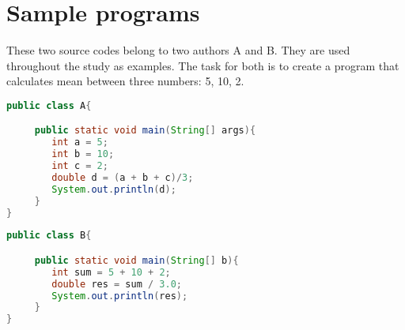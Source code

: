 \documentclass[english, grading]{tktltiki2}
\theoremstyle{definition}
\theoremstyle{remark}
\numberwithin{equation}{section} %
\begin{document}
\lstset{style=mystyle}

\section{Sample programs}

These two source codes belong to two authors A and B. They are used throughout the study as examples. The task for both is to create a program that calculates mean between three numbers: 5, 10, 2.

\begin{lstlisting}[language=Java, caption=Java example belonging to author A]
public class A{

     public static void main(String[] args){
        int a = 5;
        int b = 10;
        int c = 2;
        double d = (a + b + c)/3;
        System.out.println(d);
     }
}
\end{lstlisting}

\begin{lstlisting}[language=Java, caption=Java example belonging to author B]
public class B{

     public static void main(String[] b){
        int sum = 5 + 10 + 2;
        double res = sum / 3.0;
        System.out.println(res);
     }
}
\end{lstlisting}
\end{document}
